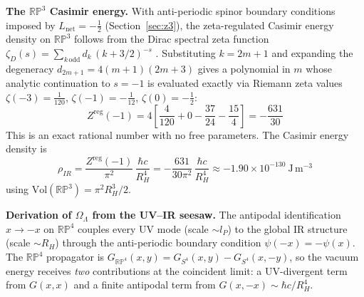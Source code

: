 \documentclass[12pt,a4paper]{article}
\begin{document}
\textbf{The $\mathbb{RP}^3$ Casimir energy.}
With anti-periodic spinor boundary conditions imposed by $L_\mathrm{net} =
-\tfrac{1}{2}$ (Section~\ref{sec:z3}), the zeta-regulated Casimir energy density
on $\mathbb{RP}^3$ follows from the Dirac spectral zeta function
$\zeta_D(s) = \sum_{k\,\mathrm{odd}} d_k\,(k{+}3/2)^{-s}$ \citep{Dowker1976,Camporesi1994}.  Substituting
$k = 2m+1$ and expanding the degeneracy $d_{2m+1} = 4(m{+}1)(2m{+}3)$ gives
a polynomial in $m$ whose analytic continuation to $s = -1$ is evaluated exactly
via Riemann zeta values $\zeta(-3)=\tfrac{1}{120}$, $\zeta(-1)=-\tfrac{1}{12}$,
$\zeta(0)=-\tfrac{1}{2}$:
\begin{equation}
  Z^\mathrm{reg}(-1)
  = 4\!\left[\frac{4}{120} + 0 - \frac{37}{24} - \frac{15}{4}\right]
  = -\frac{631}{30}
  \label{eq:Zreg}
\end{equation}
This is an exact rational number with no free parameters.  The Casimir energy
density is
\begin{equation}
  \rho_{IR}
  = \frac{Z^\mathrm{reg}(-1)}{\pi^2}\,\frac{\hbar c}{R_H^4}
  = -\frac{631}{30\pi^2}\,\frac{\hbar c}{R_H^4}
  \approx -1.90\times10^{-130}~\mathrm{J\,m^{-3}}
  \label{eq:rho_IR}
\end{equation}
using $\mathrm{Vol}(\mathbb{RP}^3) = \pi^2 R_H^3/2$.

\textbf{Derivation of $\Omega_\Lambda$ from the UV--IR seesaw.}
The antipodal identification $x \to -x$ on $\mathbb{RP}^4$ couples every UV mode
(scale $\sim l_P$) to the global IR structure (scale $\sim R_H$) through the
anti-periodic boundary condition $\psi(-x)=-\psi(x)$.  The $\mathbb{RP}^4$ propagator is
$G_{\mathbb{RP}^4}(x,y) = G_{S^4}(x,y) - G_{S^4}(x,-y)$, so the vacuum energy
receives \emph{two} contributions at the coincident limit: a UV-divergent term
from $G(x,x)$ and a finite antipodal term from $G(x,-x) \sim \hbar c/R_H^4$.
\end{document}
